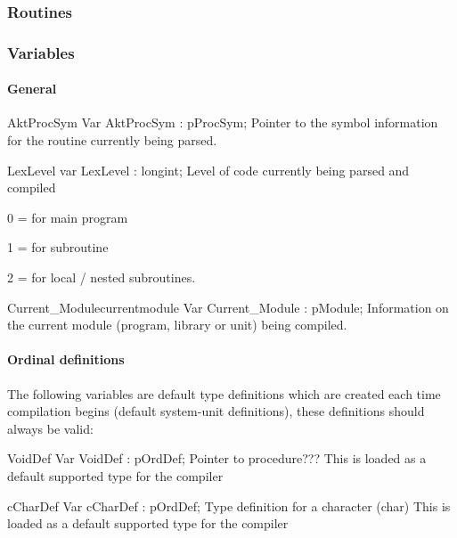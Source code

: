 \documentclass [a4paper,12pt]{article}
\begin{document}
\subsubsection{Routines}
\label{subsubsec:routinesnterfaceecla}

\subsubsection{Variables}
\label{subsubsec:variablesterfaceecla}

\paragraph{General}

\begin{variable}{AktProcSym}
\Declaration
Var AktProcSym : pProcSym;
\Description
Pointer to the symbol information for the routine currently being parsed.
\end{variable}

\begin{variable}{LexLevel}
\Declaration
var LexLevel : longint;
\Description
Level of code currently being parsed and compiled  \par 0 = for main program
\par 1 = for subroutine \par 2 = for local / nested subroutines.
\end{variable}

\begin{variablel}{Current{\_}Module}{currentmodule}
\Declaration
Var Current{\_}Module : pModule;
\Description
Information on the current module (program, library or unit) being compiled.
\end{variablel}

\paragraph{Ordinal definitions}

The following variables are default type definitions which are created each
time compilation begins (default system-unit definitions), these definitions
should always be valid:

\begin{variable}{VoidDef}
\Declaration
Var VoidDef : pOrdDef;
\Description
Pointer to procedure???
\Notes
This is loaded as a default supported type for the compiler
\end{variable}

\begin{variable}{cCharDef}
\Declaration
Var cCharDef : pOrdDef;
\Description
Type definition for a character (\textsf{char})
\Notes
This is loaded as a default supported type for the compiler
\end{variable}
\end{document}
